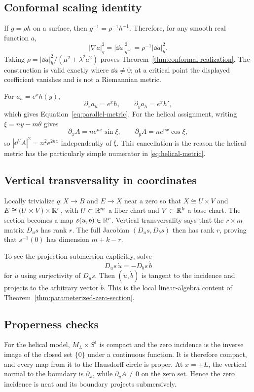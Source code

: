 \subsection{Conformal scaling identity}

If $g=\rho h$ on a surface, then $g^{-1}=\rho^{-1}h^{-1}$.  Therefore, for any
smooth real function $a$,
\begin{equation}
 |\nabla a|_g^2=|\dd a|_{g^{-1}}^2
 =\rho^{-1}|\dd a|_h^2.
 \label{eq:appendix-conformal-scaling}
\end{equation}
Taking
$\rho=|\dd a|_h^2/(\mu^2+\lambda^2a^2)$ proves
Theorem~\ref{thm:conformal-realization}.  The construction is valid exactly where
$\dd a\ne0$; at a critical point the displayed coefficient vanishes and is not a
Riemannian metric.

For $a_h=e^xh(y)$,
\[
 \partial_xa_h=e^xh,
 \qquad
 \partial_ya_h=e^xh',
\]
which gives Equation~\eqref{eq:parallel-metric}.  For the helical assignment,
writing $\xi=ny-m\theta$ gives
\[
 \partial_xA=ne^{nx}\sin\xi,
 \qquad
 \partial_yA=ne^{nx}\cos\xi,
\]
so $|\dd^VA|^2=n^2e^{2nx}$ independently of $\xi$.  This cancellation is the
reason the helical metric has the particularly simple numerator in
\eqref{eq:helical-metric}.

\subsection{Vertical transversality in coordinates}

Locally trivialize $q:X\to B$ and $E\to X$ near a zero so that
$X\cong U\times V$ and $E\cong(U\times V)\times\mathbb{R}^r$, with $U\subset\mathbb{R}^m$ a
fiber chart and $V\subset\mathbb{R}^k$ a base chart.  The section becomes a map
$s(u,b)\in\mathbb{R}^r$.  Vertical transversality says that the $r\times m$ matrix
$D_us$ has rank $r$.  The full Jacobian $(D_us,D_bs)$ then has rank $r$, proving
that $s^{-1}(0)$ has dimension $m+k-r$.

To see the projection submersion explicitly, solve
\[
 D_us\,\dot u=-D_bs\,\dot b
\]
for $\dot u$ using surjectivity of $D_us$.  Then $(\dot u,\dot b)$ is tangent to
the incidence and projects to the arbitrary vector $\dot b$.  This is the local
linear-algebra content of Theorem~\ref{thm:parameterized-zero-section}.

\subsection{Properness checks}

For the helical model, $M_L\times S^1$ is compact and the zero incidence is the
inverse image of the closed set $\{0\}$ under a continuous function.  It is
therefore compact, and every map from it to the Hausdorff circle is proper.  At
$x=\pm L$, the vertical normal to the boundary is $\partial_x$, while
$\partial_yA\ne0$ on the zero set.  Hence the zero incidence is neat and its
boundary projects submersively.

